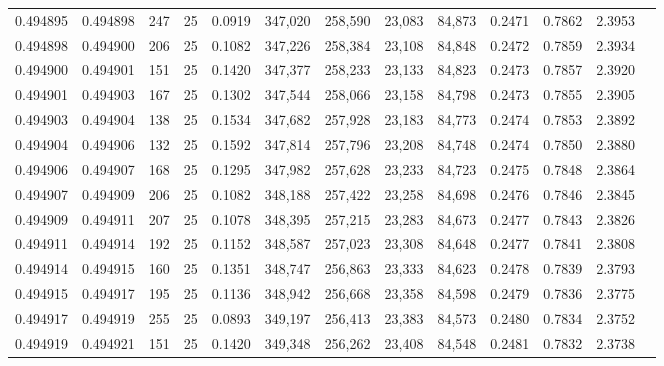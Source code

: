 \begin{tabular}{rrrrrrrrrrrrr}
0.494895 & 0.494898 &   247 &  25 &                                     0.0919 & 347,020 & 258,590 &  23,083 &  84,873 & 0.2471 & 0.7862 & 2.3953 \\
0.494898 & 0.494900 &   206 &  25 &                                     0.1082 & 347,226 & 258,384 &  23,108 &  84,848 & 0.2472 & 0.7859 & 2.3934 \\
0.494900 & 0.494901 &   151 &  25 &                                     0.1420 & 347,377 & 258,233 &  23,133 &  84,823 & 0.2473 & 0.7857 & 2.3920 \\
0.494901 & 0.494903 &   167 &  25 &                                     0.1302 & 347,544 & 258,066 &  23,158 &  84,798 & 0.2473 & 0.7855 & 2.3905 \\
0.494903 & 0.494904 &   138 &  25 &                                     0.1534 & 347,682 & 257,928 &  23,183 &  84,773 & 0.2474 & 0.7853 & 2.3892 \\
0.494904 & 0.494906 &   132 &  25 &                                     0.1592 & 347,814 & 257,796 &  23,208 &  84,748 & 0.2474 & 0.7850 & 2.3880 \\
0.494906 & 0.494907 &   168 &  25 &                                     0.1295 & 347,982 & 257,628 &  23,233 &  84,723 & 0.2475 & 0.7848 & 2.3864 \\
0.494907 & 0.494909 &   206 &  25 &                                     0.1082 & 348,188 & 257,422 &  23,258 &  84,698 & 0.2476 & 0.7846 & 2.3845 \\
0.494909 & 0.494911 &   207 &  25 &                                     0.1078 & 348,395 & 257,215 &  23,283 &  84,673 & 0.2477 & 0.7843 & 2.3826 \\
0.494911 & 0.494914 &   192 &  25 &                                     0.1152 & 348,587 & 257,023 &  23,308 &  84,648 & 0.2477 & 0.7841 & 2.3808 \\
0.494914 & 0.494915 &   160 &  25 &                                     0.1351 & 348,747 & 256,863 &  23,333 &  84,623 & 0.2478 & 0.7839 & 2.3793 \\
0.494915 & 0.494917 &   195 &  25 &                                     0.1136 & 348,942 & 256,668 &  23,358 &  84,598 & 0.2479 & 0.7836 & 2.3775 \\
0.494917 & 0.494919 &   255 &  25 &                                     0.0893 & 349,197 & 256,413 &  23,383 &  84,573 & 0.2480 & 0.7834 & 2.3752 \\
0.494919 & 0.494921 &   151 &  25 &                                     0.1420 & 349,348 & 256,262 &  23,408 &  84,548 & 0.2481 & 0.7832 & 2.3738 \\

\end{tabular}
